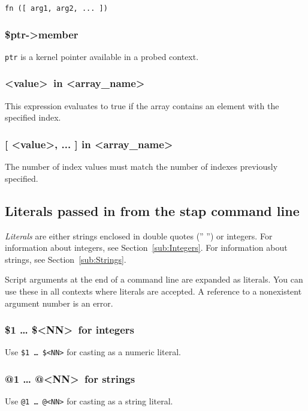 \documentclass[twoside,english]{article}
\begin{document}
\texttt{fn ({[} arg1, arg2, ... ])}


\subsubsection{\$ptr-\textgreater member}
\texttt{ptr} is a kernel pointer available in a probed context.


\subsubsection{\textless value\textgreater\ in \textless array\_name\textgreater}
This expression evaluates to true if the array contains an element with the
specified index.


\subsubsection{{[} \textless value\textgreater, ... ] in \textless array\_name\textgreater}

The number of index values must match the number of indexes previously specified.


\subsection{Literals passed in from the stap command line\label{sub:Literals-passed-in}}
\emph{Literals} are either strings enclosed in double quotes ('' '') or
integers. For information about integers, see Section~\ref{sub:Integers}.
For information about strings, see Section~\ref{sub:Strings}.

Script arguments at the end of a command line are expanded as literals. You
can use these in all contexts where literals are accepted. A reference to
a nonexistent argument number is an error.


\subsubsection{\$1 \ldots{} \$\textless NN\textgreater\ for integers}
\index{\$}
Use \texttt{\$1 \ldots{} \$<NN>} for casting as a numeric literal.


\subsubsection{@1 \ldots{} @\textless NN\textgreater\ for strings}

Use \texttt{@1 \ldots{} @<NN>} for casting as a string literal.
\end{document}
